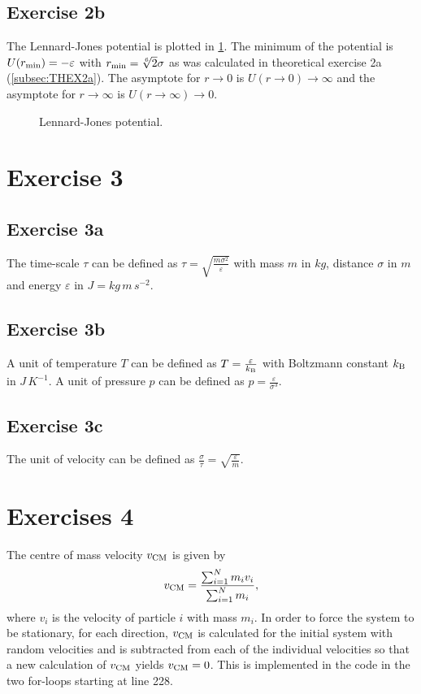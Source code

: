 \documentclass[titlepage]{report}
\newcommand\inputpgf[2]{{
		\let\pgfimageWithoutPath\pgfimage 
		\renewcommand{\pgfimage}[2][]{\pgfimageWithoutPath[##1]{#1/##2}}
		
	}}
\newcommand\pgffigure[1]{{
			\beginpgfgraphicnamed{PGFFigures/#1}
			\inputpgf{Figures}{#1.pgf}
			\endpgfgraphicnamed
		}}
\begin{document}
\subsection{Exercise 2b}
The Lennard-Jones potential is plotted in \cref{fig:MDSLEX2b}.
The minimum of the potential is $ U(r_{\rm{min}}) = -\varepsilon $ with $ r_{\rm{min}} = \sqrt[6]{2} \sigma $ as was calculated in theoretical exercise 2a (\cref{subsec:THEX2a}).
The asymptote for $ r \rightarrow 0 $ is $ U(r \rightarrow 0) \rightarrow \infty $ and the asymptote for $ r \rightarrow \infty $ is $ U(r \rightarrow \infty) \rightarrow 0 $.

\begin{figure}[h!]
	\centering
	\pgffigure{MDSLEX2b}
	\caption{Lennard-Jones potential.}
	\label{fig:MDSLEX2b}
\end{figure}

\section{Exercise 3}
\subsection{Exercise 3a}
The time-scale $ \tau $ can be defined as $ \tau = \sqrt{\frac{m \sigma^2}{\varepsilon}} $ with mass $ m $ in $ \unit{kg} $, distance $ \sigma $ in $ \unit{m} $ and energy $ \varepsilon $ in $ \unit{J} = \unit{kg \, m \, s^{-2}} $.

\subsection{Exercise 3b}
A unit of temperature $ T $ can be defined as $ T = \frac{\varepsilon}{k_{\rm{B}}} $ with Boltzmann constant $ k_{\rm{B}} $ in $ \unit{J \, K^{-1}} $.
A unit of pressure $ p $ can be defined as $ p = \frac{\varepsilon}{\sigma^3} $.

\subsection{Exercise 3c}
The unit of velocity can be defined as $ \frac{\sigma}{\tau} = \sqrt{\frac{\varepsilon}{m}} $.

\section{Exercises 4}
The centre of mass velocity $ v_{\rm{CM}} $ is given by
\begin{equation}
	v_{\rm{CM}} = \frac{\sum_{i = 1}^{N} m_i v_i}{ \sum_{i = 1}^{N} m_i },
\end{equation}
where $ v_i $ is the velocity of particle $ i $ with mass $ m_i $. 
In order to force the system to be stationary, for each direction, $ v_{\rm{CM}} $ is calculated for the initial system with random velocities and is subtracted from each of the individual velocities so that a new calculation of $ v_{\rm{CM}} $ yields $ v_{\rm{CM}} = 0 $.
This is implemented in the code in the two for-loops starting at line 228.
\end{document}
